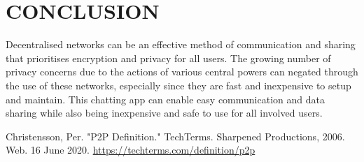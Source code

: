 \documentclass{fisatproject}
\begin{document}
\chapter{CONCLUSION}

Decentralised networks can be an effective method of communication and sharing that prioritises encryption and privacy for all users. The growing number of privacy concerns due to the actions of various central powers can negated through the use of these networks, especially since they are fast and inexpensive to setup and maintain. This chatting app can enable easy communication and data sharing while also being inexpensive and safe to use for all involved users.
\newpage



\begin{thebibliography}{1}
	 Christensson, Per. "P2P Definition." TechTerms. Sharpened Productions, 2006. Web. 16 June 2020. 
	\url{https://techterms.com/definition/p2p}
	
\end{thebibliography}
\end{document}
